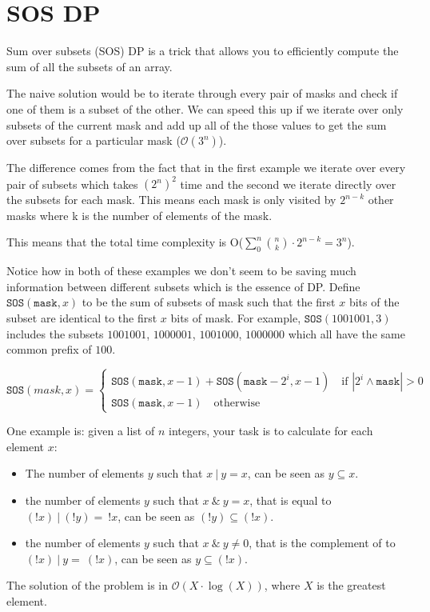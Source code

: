 \section{SOS DP}
Sum over subsets (SOS) DP is a trick that allows you to efficiently compute the sum of all the subsets of an array.

The naive solution would be to iterate through every pair of masks and check if one of them is a subset of the other. We can speed this up if we iterate over only subsets of the current mask and add up all of the those values to get the sum over subsets for a particular mask ($\mathcal{O}(3^n)$).

The difference comes from the fact that in the first example we iterate over every pair of subsets which takes $(2^n)^2$ time and the second we iterate directly over the subsets for each mask. This means each mask is only visited by $2^{n - k}$ other masks where k is the number of elements of the mask.

This means that the total time complexity is O($\sum_{0}^{n} {n \choose k} \cdot 2^{n - k} = 3^n$).

Notice how in both of these examples we don't seem to be saving much information between different subsets which is the essence of DP.
Define $\texttt{SOS}(\texttt{mask}, x)$ to be the sum of subsets of mask such that the first $x$ bits of the subset are identical to the first $x$ bits of mask.
For example, $\texttt{SOS}(1001001, 3)$ includes the subsets $1001001$, $1000001$, $1001000$, $1000000$ which all have the same common prefix of $100$.

\[
\texttt{SOS}(mask, x) = \begin{cases}
    \texttt{SOS}(\texttt{mask}, x - 1) + \texttt{SOS}(\texttt{mask} - 2^i, x - 1)  \quad \textrm{if } |2^i \wedge \texttt{mask}| > 0 \\

    \texttt{SOS}(\texttt{mask}, x - 1) \quad \textrm{otherwise}  
\end{cases}
\]


One example is: given a list of $n$ integers, your task is to calculate for each element $x$:

\begin{itemize}
    \item The number of elements $y$ such that $x~|~y=x$, can be seen as $y \subseteq x$.
    \item the number of elements $y$ such that $x~\&~y=x$, that is equal to $(!x)~|~(!y)=~!x$, can be seen as $(!y) \subseteq (!x)$.
    \item the number of elements $y$ such that $x~\&~y\neq0$, that is the complement of to $(!x)~|~y=~(!x)$, can be seen as $y \subseteq (!x)$.
\end{itemize}

The solution of the problem is in $\mathcal{O}(X\cdot \log(X))$, where $X$ is the greatest element.

